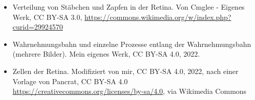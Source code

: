 \documentclass{beamer}
\begin{document}
\begin{frame}
\begin{tiny}
\begin{itemize}
\item
Verteilung von Stäbchen und Zapfen in der Retina. Von Cmglee - Eigenes Werk, CC BY-SA 3.0, \url{https://commons.wikimedia.org/w/index.php?curid=29924570}

\item
Wahrnehmungsbahn und einzelne Prozesse entlang der Wahrnehmungsbahn (mehrere Bilder). Mein eigenes Werk, CC BY-SA 4.0, 2022. 

\item
Zellen der Retina. Modifiziert von mir, CC BY-SA 4.0, 2022, nach einer Vorlage von  Pancrat, CC BY-SA 4.0 \url{https://creativecommons.org/licenses/by-sa/4.0}, via Wikimedia Commons

\end{itemize}
\end{tiny}
\end{frame}
\end{document}
